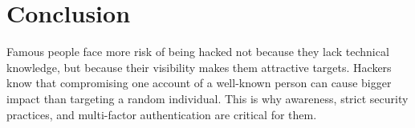 \documentclass[12pt]{article}
\begin{document}
\section*{Conclusion}

Famous people face more risk of being hacked not because they lack technical knowledge, but because their visibility makes them attractive targets. Hackers know that compromising one account of a well-known person can cause bigger impact than targeting a random individual. This is why awareness, strict security practices, and multi-factor authentication are critical for them.
\end{document}
